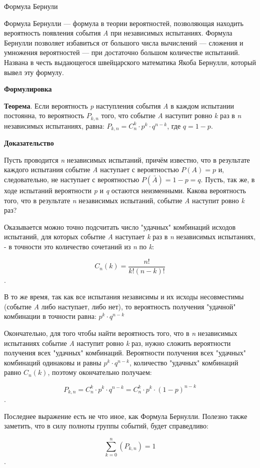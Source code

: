\documentclass[11pt, a4paper]{article}
\begin{document}
 \begin{center} 
  {\LARGE Формула Бернули} 
 \end{center}

Формула Бернулли — формула в теории вероятностей, позволяющая находить вероятность появления события \textit{A} при независимых испытаниях. Формула Бернулли позволяет избавиться от большого числа вычислений — сложения и умножения вероятностей — при достаточно большом количестве испытаний. Названа в честь выдающегося швейцарского математика Якоба Бернулли, который вывел эту формулу.

 \begin{center}
   \textbf{Формулировка}
 \end{center}

\textbf{Теорема}. Если вероятность \textit{p} наступления события \textit{A} в каждом испытании постоянна, то вероятность $ P_{k,n}$ того, что событие \textit{A} наступит ровно \textit{k} раз в \textit{n} независимых испытаниях, равна: $ P_{k,n}=C^{k}_{n}\cdot p^{k}\cdot q^{n-k} $, где  $q=1-p$.

 \begin{center}
   \textbf{Доказательство}
 \end{center}
 
 Пусть проводится \textit{n} независимых испытаний, причём известно, что в результате каждого испытания событие \textit{A} наступает с вероятностью $ P\left(A\right)=p $ и, следовательно, не наступает с вероятностью $ P\left({\bar {A}}\right)=1-p=q $. Пусть, так же, в ходе испытаний вероятности \textit{p} и \textit{q} остаются неизменными. Какова вероятность того, что в результате \textit{n} независимых испытаний, событие \textit{A} наступит ровно \textit{k} раз?

Оказывается можно точно подсчитать число "удачных" комбинаций исходов испытаний, для которых событие \textit{A} наступает \textit{k} раз в \textit{n} независимых испытаниях, - в точности это количество сочетаний из \textit{n} по \textit{k}:

$$ C_{n}(k)={\frac  {n!}{k!\left(n-k\right)!}} $$.

В то же время, так как все испытания независимы и их исходы несовместимы (событие \textit{A} либо наступает, либо нет), то вероятность получения "удачной" комбинации в точности равна: $ p^{k}\cdot q^{n-k} $

Окончательно, для того чтобы найти вероятность того, что в \textit{n} независимых испытаниях событие \textit{A} наступит ровно \textit{k} раз, нужно сложить вероятности получения всех "удачных" комбинаций. Вероятности получения всех "удачных" комбинаций одинаковы и равны $ p^{k}\cdot q^{n-k}$, количество "удачных" комбинаций равно $ C_{n}(k) $, поэтому окончательно получаем:

 $$ P_{{k,n}}=C_{n}^{k}\cdot p^{k}\cdot q^{{n-k}}=C_{n}^{k}\cdot p^{k}\cdot (1-p)^{{n-k}}$$.

Последнее выражение есть не что иное, как Формула Бернулли. Полезно также заметить, что в силу полноты группы событий, будет справедливо:

$$ \sum _{{k=0}}^{n}(P_{{k,n}})=1 $$.
\end{document}
